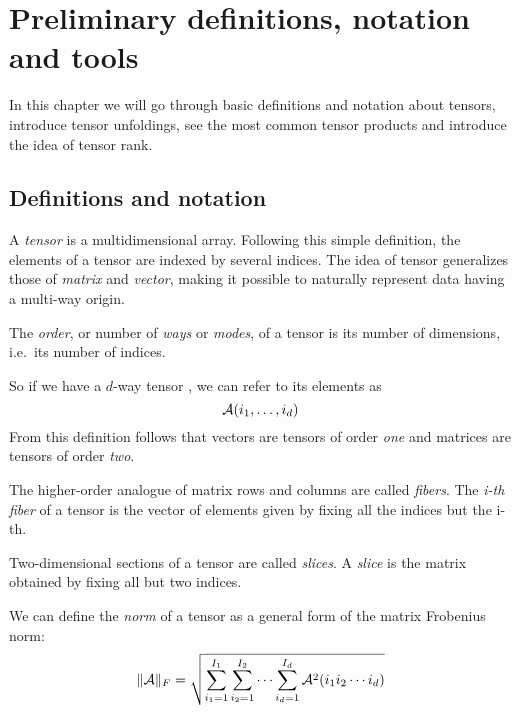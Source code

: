 \chapter{Preliminary definitions, notation and tools}

In this chapter we will go through basic definitions and notation about tensors, introduce tensor unfoldings, see the most common tensor products and introduce the idea of tensor rank.

\section{Definitions and notation}

A \emph{tensor} is a multidimensional array. Following this simple definition, the elements of a tensor are indexed by several indices.
The idea of tensor generalizes those of \emph{matrix} and \emph{vector}, making it possible to naturally represent data having a multi-way origin.

\begin{Def}
  The \emph{order}, or number of \emph{ways} or \emph{modes}, of a tensor is its number of dimensions, i.e.\ its number of indices.
\end{Def}
So if we have a $d$-way tensor \A, we can refer to its elements as
\begin{equation*}
  \mathcal{A}(i_1,\ldots,i_d)
\end{equation*}
From this definition follows that vectors are tensors of order \emph{one} and matrices are tensors of order \emph{two}.

\begin{Def}
  The higher-order analogue of matrix rows and columns are called \emph{fibers}. The \emph{i-th fiber} of a tensor \A is the vector of elements given by fixing all the indices but the i-th.
\end{Def}

\begin{Def}
  Two-dimensional sections of a tensor are called \emph{slices}. A \emph{slice} is the matrix obtained by fixing all but two indices.
\end{Def}

\begin{Def}
  We can define the \emph{norm} of a tensor as a general form of the matrix Frobenius norm:
  \[
  \|\mathcal{A}\|_F = \sqrt{\sum_{i_1 = 1}^{I_1}\sum_{i_2 = 1}^{I_2}\cdots\sum_{i_d = 1}^{I_d}\mathcal{A}^2(i_1 i_2 \cdots i_d)}
  \]
\end{Def}

